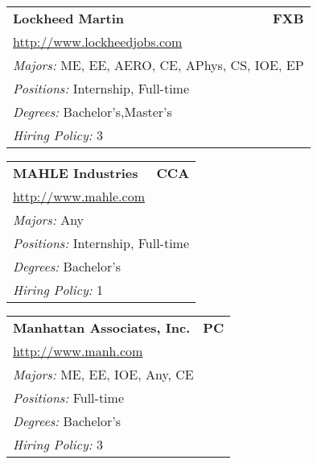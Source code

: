 \documentclass[twoside]{article}
\begin{document}
\begin{center}
\begin{multicols}{3}
\begin{FlushLeft}
\begin{minipage}{.9\columnwidth}
\end{minipage}
 
\begin{minipage}{.9\columnwidth}\begin{tabularx}{.95\columnwidth}{Xr}
                 {\Large\bf Lockheed Martin} & {\Large\bf FXB}\\
    \multicolumn{2}{p{.95\columnwidth}}{\url{http://www.lockheedjobs.com}}\\
    \multicolumn{2}{p{.95\columnwidth}}{\emph{Majors:} ME, EE, AERO, CE, APhys, CS, IOE, EP}\\
    \multicolumn{2}{p{.95\columnwidth}}{\emph{Positions:} Internship, Full-time}\\
    \multicolumn{2}{p{.95\columnwidth}}{\emph{Degrees:} Bachelor's,Master's}\\
    \multicolumn{2}{p{.95\columnwidth}}{\emph{Hiring Policy:} 3}\\
    \end{tabularx}
    
\end{minipage}
 
\begin{minipage}{.9\columnwidth}\begin{tabularx}{.95\columnwidth}{Xr}
                 {\Large\bf MAHLE Industries} & {\Large\bf CCA}\\
    \multicolumn{2}{p{.95\columnwidth}}{\url{http://www.mahle.com}}\\
    \multicolumn{2}{p{.95\columnwidth}}{\emph{Majors:} Any}\\
    \multicolumn{2}{p{.95\columnwidth}}{\emph{Positions:} Internship, Full-time}\\
    \multicolumn{2}{p{.95\columnwidth}}{\emph{Degrees:} Bachelor's}\\
    \multicolumn{2}{p{.95\columnwidth}}{\emph{Hiring Policy:} 1}\\
    \end{tabularx}
    
\end{minipage}
 
\begin{minipage}{.9\columnwidth}\begin{tabularx}{.95\columnwidth}{Xr}
                 {\Large\bf Manhattan Associates, Inc.} & {\Large\bf PC}\\
    \multicolumn{2}{p{.95\columnwidth}}{\url{http://www.manh.com}}\\
    \multicolumn{2}{p{.95\columnwidth}}{\emph{Majors:} ME, EE, IOE, Any, CE}\\
    \multicolumn{2}{p{.95\columnwidth}}{\emph{Positions:} Full-time}\\
    \multicolumn{2}{p{.95\columnwidth}}{\emph{Degrees:} Bachelor's}\\
    \multicolumn{2}{p{.95\columnwidth}}{\emph{Hiring Policy:} 3}\\
    \end{tabularx}
    

\end{minipage}
\end{FlushLeft}
\end{multicols}
\end{center}
\end{document}
